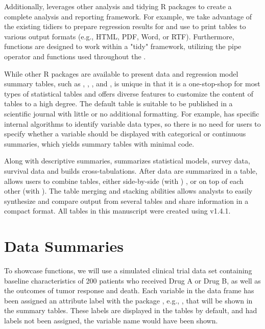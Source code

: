 Additionally,  leverages other analysis and tidying R packages to create a complete analysis and reporting framework.
For example, we take advantage of the existing  \citep{broom} tidiers to prepare regression results for  and use  \citep{gt} to print  tables to various output formats (e.g., HTML, PDF, Word, or RTF).
Furthermore,  functions are designed to work within a "tidy" framework, utilizing the  \citep{magrittr} pipe operator and  \citep{tidyselect} functions used throughout the  \citep{tidyverse}.

While other R packages are available to present data and regression model summary tables, such as , , , and ,  is unique in that it is a one-stop-shop for most types of statistical tables and offers diverse features to customize the content of tables to a high degree.
The default  table is suitable to be published in a scientific journal with little or no additional formatting.
For example,  has specific internal algorithms to identify variable data types, so there is no need for users to specify whether a variable should be displayed with categorical or continuous summaries, which yields summary tables with minimal code.

Along with descriptive summaries,  summarizes statistical models, survey data, survival data and builds cross-tabulations.
After data are summarized in a table,  allows users to combine tables, either side-by-side (with ) , or on top of each other (with ).
The table merging and stacking abilities allows analysts to easily synthesize and compare output from several tables and share information in a compact format.
All tables in this manuscript were created using  v1.4.1.

\section{Data Summaries}

To showcase  functions, we will use a simulated clinical trial data set containing baseline characteristics of 200 patients who received Drug A or Drug B, as well as the outcomes of tumor response and death.
Each variable in the data frame has been assigned an attribute label with the  package \citep{labelled}, e.g., , that will be shown in the summary tables.
These labels are displayed in the  tables by default, and had labels not been assigned, the variable name would have been shown.

